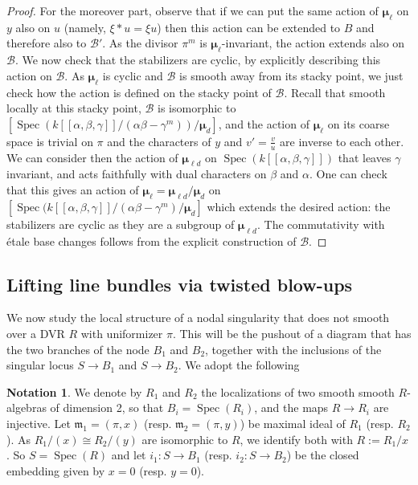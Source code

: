 \documentclass{amsart}
\newcommand{\cB}{\mathcal{B}}
\newcommand{\spec}{\operatorname{Spec}}
\newcommand{\bmu}{\bm{\mu}}
\theoremstyle{definition}
\newtheorem{Notation}[theorem]{Notation}
\begin{document}
\begin{proof}
For the moreover part, observe that if we can put the same action of $\bmu_\ell$ on $y$ also on $u$ (namely, $\xi*u = \xi u$) then this action can be extended to $B$ and therefore also to $\cB'$. As the divisor $\pi^m$ is $\bmu_\ell$-invariant, the action extends also on $\cB$. We now check that the stabilizers are cyclic, by explicitly describing this action on $\cB$. As $\bmu_\ell$ is cyclic and $\cB$ is smooth away from its stacky point, we just check how the action is defined on the stacky point of $\cB$. Recall that smooth locally at this stacky point, $\cB$ is isomorphic to $[\spec(k[\![\alpha,\beta,\gamma]\!]/(\alpha\beta - \gamma^m))/\bmu_d]$, and the action of $\bmu_\ell$
on its coarse space is trivial on $\pi$ and the characters of $y$ and $v'= \frac{v}{u}$ are inverse to each other. We can consider then the action of $\bmu_{\ell d}$ on $\spec(k[\![\alpha,\beta,\gamma]\!])$ that leaves $\gamma$ invariant, and acts faithfully with dual characters on $\beta$ and $\alpha$. One can check that this gives an action of $\bmu_\ell = \bmu_{\ell d}/\bmu_d$ on $[\spec(k[\![\alpha,\beta,\gamma]\!]/(\alpha\beta - \gamma^m)/\bmu_d]$ which extends the desired action: the stabilizers are cyclic as they are a subgroup of $\bmu_{\ell d}$. The commutativity with \'etale base changes follows from the explicit construction of $\cB$.
\end{proof}

\subsection{Lifting line bundles via twisted blow-ups}
We now study the local structure of a nodal singularity that does not smooth over a DVR $R$ with uniformizer $\pi$. 
This will be the pushout of a diagram that has the two branches of the node $B_1$ and $B_2$, together with the inclusions of the singular locus $S\to B_1$ and $S\to B_2$. We adopt the following

\begin{Notation}\label{notation node}
 We denote by $R_1$ and $R_2$ the localizations of two smooth smooth $R$-algebras of dimension 2, so that $B_i=\spec(R_i)$, and the maps $R\to R_i$ are injective. Let $\mathfrak{m}_1=(\pi,x)$ (resp. $\mathfrak{m}_2=(\pi,y)$) be maximal ideal of $R_1$ (resp. $R_2$). As $R_1/(x)\cong R_2/(y)$ are isomorphic to $R$, we identify both with $R:= R_1/x$.
So $S=\spec(R)$ and let $i_1:S\to B_1$ (resp. $i_2:S\to B_2$) be the closed embedding given by $x=0$ (resp. $y=0$). 
\end{Notation}
\end{document}
